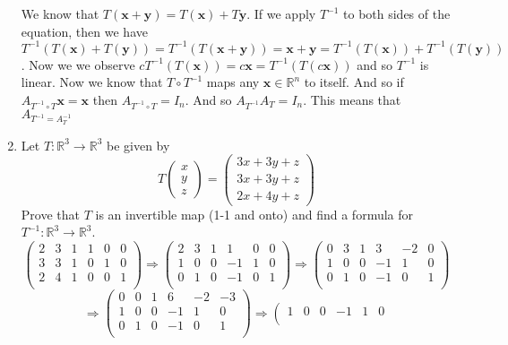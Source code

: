 \documentclass[letterpaper]{article}
\begin{document}
\begin{enumerate}
We know that $T(\mathbf{x}+\mathbf{y})=T(\mathbf{x})+T\mathbf{y}$. If we apply $T^{-1}$ to both sides of the equation, then we have $T^{-1}(T(\mathbf{x})+T(\mathbf{y}))=T^{-1}(T(\mathbf{x}+\mathbf{y}))=\mathbf{x}+\mathbf{y}=T^{-1}(T(\mathbf{x}))+T^{-1}(T(\mathbf{y}))$. Now we we observe $cT^{-1}(T(\mathbf{x}))=c\mathbf{x}=T^{-1}(T(c\mathbf{x}))$ and so $T^{-1}$ is linear. Now we know that $T\circ T^{-1}$ maps any $\mathbf{x}\in \mathbb{R}^n$ to itself. And so if $A_{T^{-1}\circ T}\mathbf{x}=\mathbf{x}$ then $A_{T^{-1}\circ T}=I_n$. And so $A_{T^{-1}}A_T=I_n$. This means that $A_{T^{-1}=A_T^{-1}}$
\item
Let $T:\mathbb{R}^3\to\mathbb{R}^3$ be given by
\[T\left(\begin{array}{r}x\\y\\z\end{array}\right)
=\left(\begin{array}{r}3x+3y+z\\3x+3y+z\\2x+4y+z\end{array}\right)\]
Prove that $T$ is an invertible map (1-1 and onto) and find a formula for $T^{-1}:\mathbb{R}^3\to\mathbb{R}^3$.
\[
\left(\begin{array}{rrr|rrr}
2&3&1&1&0&0\\
3&3&1&0&1&0\\
2&4&1&0&0&1\\
\end{array}\right)
\Rightarrow
\left(\begin{array}{rrr|rrr}
2&3&1& 1& 0&0\\
1&0&0&-1& 1&0\\
0&1&0&-1& 0&1\\
\end{array}\right)
\Rightarrow
\left(\begin{array}{rrr|rrr}
0&3&1& 3&-2&0\\
1&0&0&-1& 1&0\\
0&1&0&-1& 0&1\\
\end{array}\right)\]
\[
\Rightarrow
\left(\begin{array}{rrr|rrr}
0&0&1& 6&-2&-3\\
1&0&0&-1& 1& 0\\
0&1&0&-1& 0& 1\\
\end{array}\right)
\Rightarrow
\left(\begin{array}{rrr|rrr}
1&0&0&-1& 1& 0\\

\end{array}\]
\end{enumerate}
\end{document}

